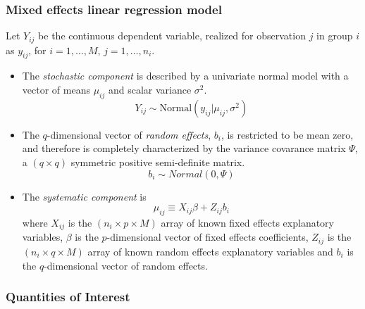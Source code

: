 \subsubsection{Mixed effects linear regression model}

Let $Y_{ij}$ be the continuous dependent variable, realized for observation $j$ in group $i$ as $y_{ij}$, for $i = 1, \ldots, M$, $j = 1, \ldots, n_i$.

\begin{itemize}
\item The \emph{stochastic component} is described by a univariate normal model with a vector of means $\mu_{ij}$ and scalar variance $\sigma^2$.
\begin{equation*}
Y_{ij} \sim \mathrm{Normal}(y_{ij} | \mu_{ij}, \sigma^2)
\end{equation*}
\item The $q$-dimensional vector of \emph{random effects}, $b_i$, is restricted to be mean zero, and therefore is completely characterized by the variance covarance matrix $\Psi$, a $(q \times q)$ symmetric positive semi-definite matrix.
\begin{equation*}
b_i \sim Normal(0, \Psi)
\end{equation*}
\item The \emph{systematic component} is
\begin{equation*}
\mu_{ij} \equiv X_{ij} \beta + Z_{ij} b_i
\end{equation*}
where $X_{ij}$ is the $(n_i \times p \times M)$ array of known fixed effects explanatory variables, $\beta$ is the $p$-dimensional vector of fixed effects coefficients, $Z_{ij}$ is the $(n_i \times q \times M)$ array of known random effects explanatory variables and $b_i$ is the $q$-dimensional vector of random effects.
\end{itemize}

\subsubsection{Quantities of Interest}

